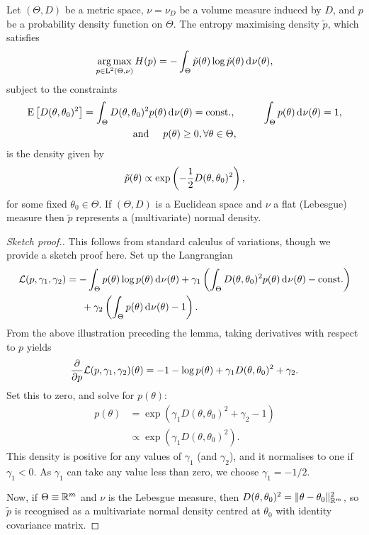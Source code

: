 \begin{lemma}\label{thm:maxentr}
  Let $(\Theta,D)$ be a metric space, $\nu=\nu_D$ be a volume measure induced by $D$, and $p$ be a probability density function on $\Theta$.
  The entropy maximising density $\tilde p$, which satisfies
  \[
    \operatorname*{arg\,max}_{p\in\text{L}^2(\Theta,\nu)} H(p) = - \int_\Theta \tilde p(\theta) \log \tilde p(\theta) \operatorname{d}\hspace{0.5pt}\!\nu(\theta),
  \]
  subject to the constraints
  \begin{align*}
    \begin{gathered}
      \operatorname{E}\big[D(\theta,\theta_0)^2\big] = \int_\Theta D(\theta,\theta_0)^2 p(\theta) \operatorname{d}\hspace{0.5pt}\! \nu(\theta) = \text{const.}\hspace{0.01em}, \hspace{1cm} 
      \int_\Theta p(\theta) \operatorname{d}\hspace{0.5pt}\! \nu(\theta) = 1, \\
      \text{and} \hspace{0.5cm} p(\theta) \geq 0, \forall \theta \in \Theta,
    \end{gathered}
  \end{align*}
  is the density given by
  \[
    \tilde p(\theta) \propto \exp \left(-\frac{1}{2} D(\theta,\theta_0)^2 \right),
  \]
  for some fixed $\theta_0\in\Theta$.
  If $(\Theta,D)$ is a Euclidean space and $\nu$ a flat (Lebesgue) measure then $\tilde p$ represents a (multivariate) normal density.
\end{lemma}

\begin{proof}[Sketch proof.]
  This follows from standard calculus of variations, though we provide a sketch proof here.
  Set up the Langrangian
  \begin{align*}
      {\mathcal L}(p,\gamma_1,\gamma_2) &= 
      - \int_\Theta p(\theta) \log p(\theta) \operatorname{d}\hspace{0.5pt}\!\nu(\theta) +
      \gamma_1 \left(\int_\Theta D(\theta,\theta_0)^2 p(\theta) \operatorname{d}\hspace{0.5pt}\!\nu(\theta) - \text{const.}\hspace{0.01em} \right) \\
      &\phantom{==} + \gamma_2 \left( \int_\Theta p(\theta) \operatorname{d}\hspace{0.5pt}\!\nu(\theta) - 1 \right).
  \end{align*}
  From the above illustration preceding the lemma, taking derivatives with respect to $p$ yields
  \begin{align*}
    \frac{\partial}{\partial p} {\mathcal L}(p,\gamma_1,\gamma_2)(\theta)
    = - 1 - \log p(\theta) + \gamma_1 D(\theta,\theta_0)^2 + \gamma_2.
  \end{align*}
  Set this to zero, and solve for $p(\theta)$:
  \begin{align*}
    p(\theta) &= \exp \left( \gamma_1 D(\theta,\theta_0)^2 + \gamma_2 - 1 \right) \\
    &\propto \exp \left( \gamma_1 D(\theta,\theta_0)^2 \right).
  \end{align*}
  This density is positive for any values of $\gamma_1$ (and $\gamma_2$), and it normalises to one if $\gamma_1 < 0$. 
  As $\gamma_1$ can take any value less than zero, we choose $\gamma_1=-1/2$.
  
  Now, if $\Theta \equiv \mathbb{R}^m$ and $\nu$ is the Lebesgue measure, then $D(\theta,\theta_0)^2 = \lVert\theta-\theta_0\rVert_{\mathbb{R}^m}^2$, so $\tilde p$ is recognised as a multivariate normal density centred at $\theta_0$ with identity covariance matrix.
\end{proof}

